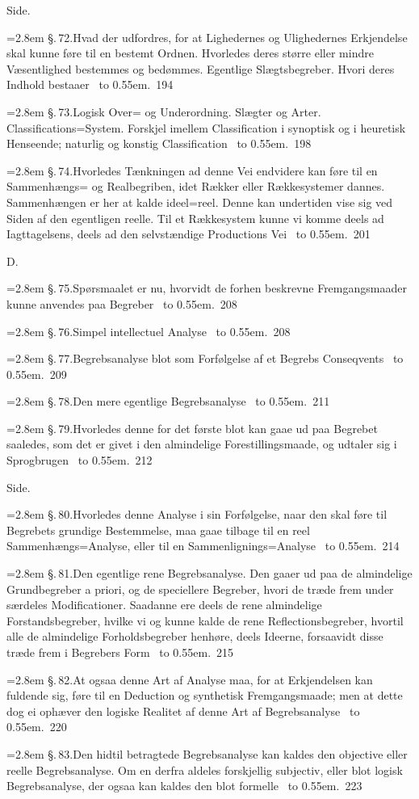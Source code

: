 \documentclass[12pt]{book}
\def\textit#1{#1}%
\newcommand{\ovside}{\par\nopagebreak\hfill{\footnotesize Side.}\par\nobreak\vspace{0.2\baselineskip}}
\newcommand{\ovrubrik}[2]{%
  \par\vspace{0.9\baselineskip}%
  \begin{center}{\textit{#1}\par}\vspace{0.25\baselineskip}{#2\par}\end{center}
  \vspace{0.4\baselineskip}}
\newcommand{\ovline}[3]{%
  \par\vspace{0.25\baselineskip}%
  \noindent\hangindent=2.8em\hangafter=1
  \textit{\S.\,#1.}\quad #2%
  \nobreak\ \leaders\hbox to 0.55em{\hss.\hss}\hfill\ \textit{#3}\par}
\begin{document}
\ovside
\ovline{72}{Hvad der udfordres, for at Lighedernes og Ulighedernes Erkjendelse
  skal kunne føre til en bestemt Ordnen. Hvorledes deres større eller mindre
  Væsentlighed bestemmes og bedømmes. Egentlige Slægtsbegreber. Hvori deres
  Indhold bestaaer}{194}
\ovline{73}{Logisk Over= og Underordning. Slægter og Arter.
  Classifications=System. Forskjel imellem Classification i synoptisk og i
  heuretisk Henseende; naturlig og konstig Classification}{198}
\ovline{74}{Hvorledes Tænkningen ad denne Vei endvidere kan føre til en
  Sammenhængs= og Realbegriben, idet Rækker eller Rækkesystemer dannes.
  Sammenhængen er her at kalde ideel=reel. Denne kan undertiden vise sig ved
  Siden af den egentligen reelle. Til et Rækkesystem kunne vi komme deels ad
  Iagttagelsens, deels ad den selvstændige Productions Vei}{201}

\ovrubrik{D.}{Begrebs=Analyse.}
\ovline{75}{Spørsmaalet er nu, hvorvidt de forhen beskrevne Fremgangsmaader
  kunne anvendes paa Begreber}{208}
\ovline{76}{Simpel intellectuel Analyse}{208}
\ovline{77}{Begrebsanalyse blot som Forfølgelse af et Begrebs
  Conseqvents}{209}
\ovline{78}{Den mere egentlige Begrebsanalyse}{211}
\ovline{79}{Hvorledes denne for det første blot kan gaae ud paa Begrebet
  saaledes, som det er givet i den almindelige Forestillingsmaade, og udtaler
  sig i Sprogbrugen}{212}

\ovside
\ovline{80}{Hvorledes denne Analyse i sin Forfølgelse, naar den skal føre til
  Begrebets grundige Bestemmelse, maa gaae tilbage til en reel
  Sammenhængs=Analyse, eller til en Sammenlignings=Analyse}{214}
\ovline{81}{Den egentlige rene Begrebsanalyse. Den gaaer ud paa de almindelige
  Grundbegreber a priori, og de speciellere Begreber, hvori de træde frem under
  særdeles Modificationer. Saadanne ere deels de rene almindelige
  Forstandsbegreber, hvilke vi og kunne kalde de rene Reflectionsbegreber,
  hvortil alle de almindelige Forholdsbegreber henhøre, deels Ideerne,
  forsaavidt disse træde frem i Begrebers Form}{215}
\ovline{82}{At ogsaa denne Art af Analyse maa, for at Erkjendelsen kan
  fuldende sig, føre til en Deduction og synthetisk Fremgangsmaade; men at
  dette dog ei ophæver den logiske Realitet af denne Art af
  Begrebsanalyse}{220}
\ovline{83}{Den hidtil betragtede Begrebsanalyse kan kaldes den objective
  eller reelle Begrebsanalyse. Om en derfra aldeles forskjellig subjectiv,
  eller blot logisk Begrebsanalyse, der ogsaa kan kaldes den blot
  formelle}{223}
\end{document}
